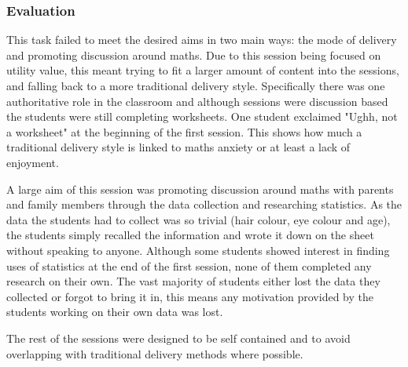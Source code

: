 \documentclass[11pt, a4paper, notitlepage]{article}
\begin{document}
\subsubsection*{Evaluation}
This task failed to meet the desired aims in two main ways: the mode of delivery and promoting discussion around maths. Due to this session being focused on utility value, this meant trying to fit a larger amount of content into the sessions, and falling back to a more traditional delivery style. Specifically there was one authoritative role in the classroom and although sessions were discussion based the students were still completing worksheets. One student exclaimed "Ughh, not a worksheet" at the beginning of the first session. This shows how much a traditional delivery style is linked to maths anxiety or at least a lack of enjoyment.
\par
A large aim of this session was promoting discussion around maths with parents and family members through the data collection and researching statistics. As the data the students had to collect was so trivial (hair colour, eye colour and age), the students simply recalled the information and wrote it down on the sheet without speaking to anyone. Although some students showed interest in finding uses of statistics at the end of the first session, none of them completed any research on their own. The vast majority of students either lost the data they collected or forgot to bring it in, this means any motivation provided by the students working on their own data was lost.
\par
The rest of the sessions were designed to be self contained and to avoid overlapping with traditional delivery methods where possible.
\end{document}
